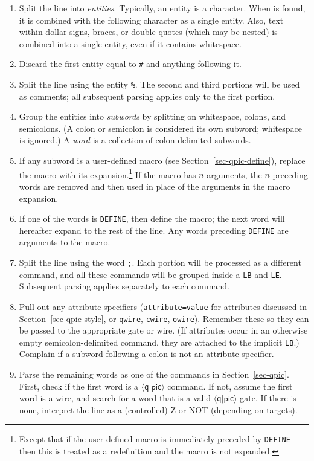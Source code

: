\documentclass[twoside,12pt]{article}
\newcommand{\qpic}{$\langle\mathsf{q}|\mathsf{pic}\rangle$\xspace}
\begin{document}
\begin{enumerate}
\item Split the line into \emph{entities}.  Typically, an entity is a character.  When {\tt {}} is found, it
is combined with the following character as a single entity.  Also, text within dollar signs, braces, or double quotes (which
may be nested) is combined into a single entity, even if it contains whitespace.
\item Discard the first entity equal to {\tt \#} and anything following it.
\item Split the line using the entity {\tt \%}.  The second and third portions will be used as comments;
  all subsequent parsing applies only to the first portion.
\item Group the entities into \emph{subwords} by splitting on whitespace,
  colons, and semicolons.  (A colon or semicolon is considered its own
  subword; whitespace is ignored.)  A \emph{word} is a collection of
  colon-delimited subwords.
\item If any subword is a user-defined macro (see Section~\ref{sec-qpic-define}), replace the macro with its expansion.\footnote{Except that if the
  user-defined macro is immediately preceded by {\tt DEFINE} then this is
  treated as a redefinition and the macro is not expanded.}  If the macro
  has $n$ arguments, the $n$ preceding words are removed and then used
  in place of the arguments in the macro expansion.
\item If one of the words is {\tt DEFINE}, then define the macro; the next word
  will hereafter expand to the rest of the line.  Any words preceding
  {\tt DEFINE} are arguments to the macro.
\item Split the line using the word {\tt ;}.  Each portion will be processed
  as a different command, and all these commands will be grouped inside a
  {\tt LB} and {\tt LE}.  Subsequent parsing applies separately to each command.
\item Pull out any attribute specifiers ({\tt attribute=value} for attributes
  discussed in Section~\ref{sec-qpic-style}, or {\tt qwire}, {\tt cwire},
  {\tt owire}).  Remember these so they can be passed to the appropriate
  gate or wire.  (If attributes occur in an otherwise empty semicolon-delimited
  command, they are attached to the implicit {\tt LB}.)  Complain if a subword
  following a colon is not an attribute specifier.
\item Parse the remaining words as one of the commands in
  Section~\ref{sec-qpic}.  First, check if the first word is a \qpic command.
  If not, assume the first word is a wire, and search for a word that is a
  valid \qpic gate.  If there is none, interpret the line as a (controlled) Z
  or NOT (depending on targets).
\end{enumerate} 




\end{document}
